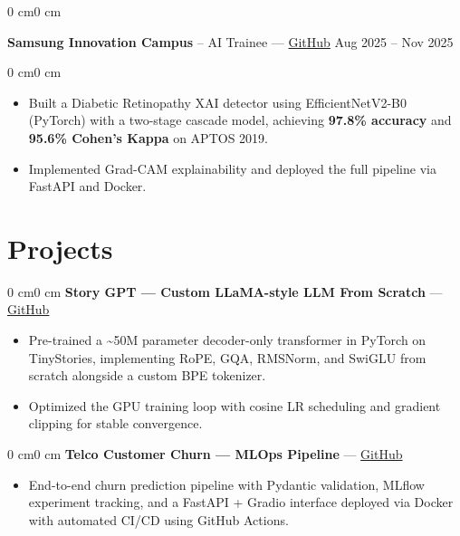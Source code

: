 \documentclass[10pt, letterpaper]{article}
\newenvironment{highlights}{\begin{itemize}[topsep=0.05 cm, parsep=0.05 cm, partopsep=0pt, itemsep=0pt, leftmargin=10pt]}{\end{itemize}}
\newenvironment{onecolentry}{\begin{adjustwidth}{0 cm}{0 cm}}{\end{adjustwidth}}
\newenvironment{twocolentry}[2][]{%
    \onecolentry
    \def\secondColumn{#2}%
}{%
    \unskip\hfill\secondColumn
    \endonecolentry
}
\begin{document}
\vspace{0.05cm}

\begin{twocolentry}{Aug 2025 -- Nov 2025}
    \textbf{Samsung Innovation Campus} -- AI Trainee --- \href{https://github.com/ZiadXI/Diabetic-Retinopathy-XAI-Detector}{GitHub}
\end{twocolentry}
\vspace{0.05 cm}
\begin{onecolentry}
\begin{highlights}
\item Built a Diabetic Retinopathy XAI detector using EfficientNetV2-B0 (PyTorch) with a two-stage cascade model, achieving \textbf{97.8\% accuracy} and \textbf{95.6\% Cohen's Kappa} on APTOS 2019.
\item Implemented Grad-CAM explainability and deployed the full pipeline via FastAPI and Docker.
\end{highlights}
\end{onecolentry}

\section{Projects}

\begin{onecolentry}
\textbf{Story GPT --- Custom LLaMA-style LLM From Scratch} --- \href{https://github.com/ZiadXI/StoryGPT}{GitHub}
\begin{highlights}
\item Pre-trained a \textasciitilde50M parameter decoder-only transformer in PyTorch on TinyStories, implementing RoPE, GQA, RMSNorm, and SwiGLU from scratch alongside a custom BPE tokenizer.
\item Optimized the GPU training loop with cosine LR scheduling and gradient clipping for stable convergence.
\end{highlights}
\end{onecolentry}

\vspace{0.05cm}

\begin{onecolentry}
\textbf{Telco Customer Churn --- MLOps Pipeline} --- \href{https://github.com/ZiadXI/telco-customer-churn}{GitHub}
\begin{highlights}
\item End-to-end churn prediction pipeline with Pydantic validation, MLflow experiment tracking, and a FastAPI + Gradio interface deployed via Docker with automated CI/CD using GitHub Actions.
\end{highlights}
\end{onecolentry}
\end{document}
